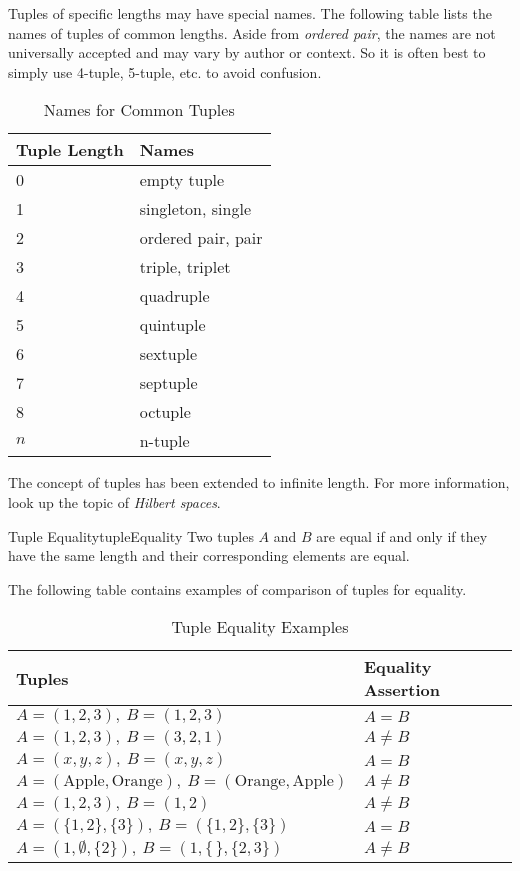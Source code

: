 Tuples of specific lengths may have special names. The following table lists the names of tuples
of common lengths. Aside from \emph{ordered pair}, the names are not universally accepted and may
vary by author or context. So it is often best to simply use 4-tuple, 5-tuple, etc. to avoid
confusion.

\begin{table}[H]
  \centering
  \begin{tabular}{ll}
  \toprule
  \textbf{Tuple Length} & \textbf{Names} \\
  \midrule
  0 & empty tuple \\
  1 & singleton, single \\
  2 & ordered pair, pair \\
  3 & triple, triplet \\
  4 & quadruple \\
  5 & quintuple \\
  6 & sextuple \\
  7 & septuple \\
  8 & octuple \\
  \( n  \) & n-tuple \\
  \bottomrule
  \end{tabular}
  \caption{Names for Common Tuples}
\end{table}

\begin{advancedTopic}
  The concept of tuples has been extended to infinite length. For more
  information, look up the topic of \emph{Hilbert spaces}.
\end{advancedTopic}

\begin{definition}{Tuple Equality}{tupleEquality}
  Two tuples \( A \) and \( B \) are equal if and only if they have the same length and
  their corresponding elements are equal.
\end{definition}

The following table contains examples of comparison of tuples for equality.

\begin{table}[H]
  \centering
  \begin{tabular}{ll}
    \toprule
    \textbf{Tuples} & \textbf{Equality Assertion} \\
    \midrule
    \( A = (1, 2, 3),\ B = (1, 2, 3) \) & \( A = B \) \\
    \( A = (1, 2, 3),\ B = (3, 2, 1) \) & \( A \neq B \) \\
    \( A = (x, y, z),\ B = (x, y, z) \) & \( A = B \) \\
    \( A = (\text{Apple}, \text{Orange}),\ B = (\text{Orange}, \text{Apple}) \) & \( A \neq B \) \\
    \( A = (1, 2, 3),\ B = (1, 2) \) & \( A \neq B \) \\
    \( A = (\{1, 2\}, \{3\}),\ B = (\{1, 2\}, \{3\}) \) & \( A = B \) \\
    \( A = (1, \emptyset, \{2\}),\ B = (1, \{\,\}, \{2, 3\}) \) & \( A \neq B \) \\
    \bottomrule
  \end{tabular}
  \caption{Tuple Equality Examples}
\end{table}
